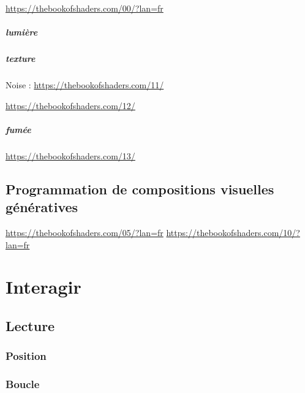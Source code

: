 \documentclass[
  french,
]{book}
\begin{document}
\url{https://thebookofshaders.com/00/?lan=fr}

\hypertarget{lumiuxe8re}{%
\paragraph{lumière}\label{lumiuxe8re}}

\hypertarget{texture-1}{%
\paragraph{texture}\label{texture-1}}

Noise : \url{https://thebookofshaders.com/11/}

\url{https://thebookofshaders.com/12/}

\hypertarget{fumuxe9e}{%
\paragraph{fumée}\label{fumuxe9e}}

\url{https://thebookofshaders.com/13/}

\hypertarget{programmation-de-compositions-visuelles-guxe9nuxe9ratives}{%
\section{Programmation de compositions visuelles génératives}\label{programmation-de-compositions-visuelles-guxe9nuxe9ratives}}

\url{https://thebookofshaders.com/05/?lan=fr}
\url{https://thebookofshaders.com/10/?lan=fr}

\hypertarget{interagir}{%
\chapter{Interagir}\label{interagir}}

\hypertarget{lecture}{%
\section{Lecture}\label{lecture}}

\hypertarget{position-1}{%
\subsection{Position}\label{position-1}}

\hypertarget{boucle}{%
\subsection{Boucle}\label{boucle}}
\end{document}

